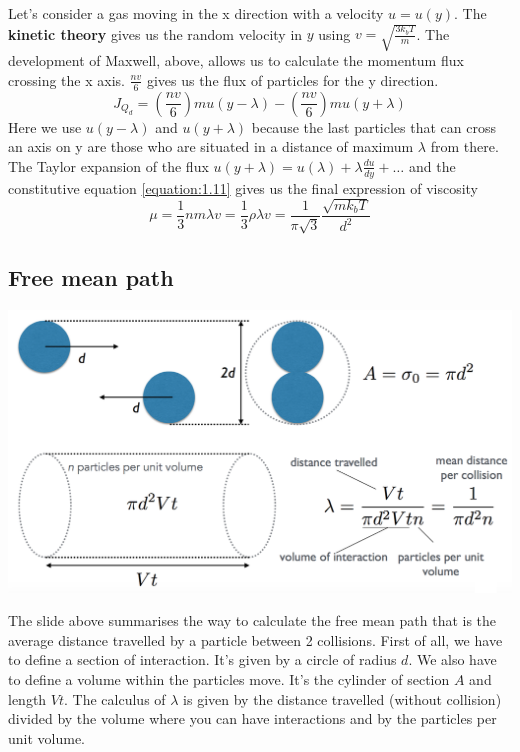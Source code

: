 Let's consider a gas moving in the x direction with a velocity $u=u(y)$. The \textbf{kinetic theory} gives us the random velocity in $y$ using $v = \sqrt{\frac{3k_bT}{m}}$. The development of Maxwell, above, allows us to calculate the momentum flux crossing the x axis. $\frac{nv}{6}$ gives us the flux of particles for the y direction. 
\begin{equation}
	J_{Q_d} = \left(\frac{nv}{6}\right)mu(y-\lambda) - \left(\frac{nv}{6}\right)mu(y+\lambda)
\end{equation}
Here we use $u(y-\lambda)$ and $u(y+\lambda)$ because the last particles that can cross an axis on y are those who are situated in a distance of maximum $\lambda$ from there. \\
The Taylor expansion of the flux $u(y + \lambda) = u(\lambda) + \lambda\frac{du}{dy} + \dots$ and the constitutive equation \eqref{equation:1.11} gives us the final expression of viscosity 
\begin{equation}
	\mu = \frac{1}{3}nm\lambda v = \frac{1}{3}\rho \lambda v = \frac{1}{\pi \sqrt{3}}\frac{\sqrt{mk_bT}}{d^2}
	\label{equation:1.15}
\end{equation}
	
\subsection{Free mean path}
\begin{center}
	\includegraphics[scale=0.45]{ch1/9}
\end{center}
The slide above summarises the way to calculate the free mean path that is the average distance travelled by a particle between 2 collisions. First of all, we have to define a section of interaction. It's given by a circle of radius $d$. We also have to define a volume within the particles move. It's the cylinder of section $A$ and length $Vt$. The calculus of $\lambda$ is given by the distance travelled (without collision) divided by the volume where you can have interactions and by the particles per unit volume. 
	
